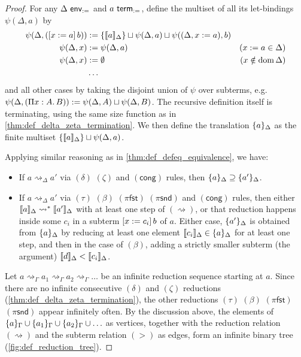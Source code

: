 \documentclass[twoside]{report}
\begin{document}
\begin{proof}
    For any $\Delta \ \mathsf{env}_{:=}$ and $a \ \mathsf{term}_{:=}$, define the multiset of all its let-bindings $\psi(\Delta, a)$ by
    $$
        \begin{aligned}
            \psi(\Delta, ([{x}:={a}]\,{b})) & := \{\llbracket{a}\rrbracket_\Delta\} \sqcup \psi(\Delta, a) \sqcup \psi((\Delta, x := a), b)                           \\
            \psi(\Delta, x)             & := \psi(\Delta, a)                                                                  & (x := a \in \Delta) \\
            \psi(\Delta, x)             & := \emptyset                                                                        & (x\notin\operatorname{dom}\Delta)     \\
                                        & \ldots
        \end{aligned}
    $$
    and all other cases by taking the disjoint union of $\psi$ over subterms, e.g. $\psi(\Delta, (\Pi{x} : {A}.\,{B})) := \psi(\Delta, A) \sqcup \psi(\Delta, B)$. The recursive definition itself is terminating, using the same size function as in \cref{thm:def_delta_zeta_termination}. We then define the translation $\{{a}\}_\Delta$ as the finite multiset $\{\llbracket{a}\rrbracket_\Delta\} \sqcup \psi(\Delta, a)$.

    Applying similar reasoning as in \cref{thm:def_defeq_equivalence}, we have:

    \begin{itemize}[noitemsep]
        \item If $a \rightsquigarrow_\Delta a'$ via $(\delta)$ $(\zeta)$ and $(\mathsf{cong})$ rules, then $\{{a}\}_\Delta \supseteq \{{a'}\}_\Delta$.
        \item If $a \rightsquigarrow_\Delta a'$ via $(\tau)$ $(\beta)$ $(\pi\mathsf{fst})$ $(\pi\mathsf{snd})$ and $(\mathsf{cong})$ rules, then either $\llbracket{a}\rrbracket_\Delta \rightsquigarrow^\ast \llbracket{a'}\rrbracket_\Delta$ with at least one step of $(\rightsquigarrow)$, or that reduction happens inside some $c_i$ in a subterm $[{x}:={c_i}]\,{b}$ of $a$. Either case, $\{{a'}\}_\Delta$ is obtained from $\{{a}\}_\Delta$ by reducing at least one element $\llbracket{c_i}\rrbracket_\Delta \in \{{a}\}_\Delta$ for at least one step, and then in the case of $(\beta)$, adding a strictly smaller subterm (the argument) $\llbracket{d}\rrbracket_\Delta < \llbracket{c_i}\rrbracket_\Delta$.
    \end{itemize}

    Let $a \rightsquigarrow_\Gamma a_1 \rightsquigarrow_\Gamma a_2 \rightsquigarrow_\Gamma \ldots$ be an infinite reduction sequence starting at $a$. Since there are no infinite consecutive $(\delta)$ and $(\zeta)$ reductions (\cref{thm:def_delta_zeta_termination}), the other reductions $(\tau)$ $(\beta)$ $(\pi\mathsf{fst})$ $(\pi\mathsf{snd})$ appear infinitely often. By the discussion above, the elements of $\{{a}\}_\Gamma \cup \{{a_1}\}_\Gamma \cup \{{a_2}\}_\Gamma \cup \ldots$ as vertices, together with the reduction relation $(\rightsquigarrow)$ and the subterm relation $(>)$ as edges, form an infinite binary tree (\cref{fig:def_reduction_tree}).


\end{proof}
\end{document}
